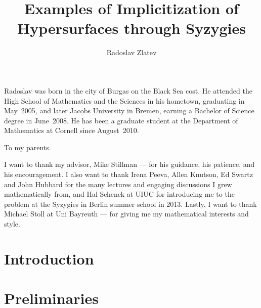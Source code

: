 \documentclass[phd,tocprelim]{cornell}
\title {Examples of Implicitization of Hypersurfaces through Syzygies}
\author {Radoslav Zlatev}
\numberwithin{first}{chapter}
\begin{document}
\maketitle
\makecopyright

\begin{abstract}
\end{abstract}

\begin{biosketch}
Radoslav was born in the city of Burgas on the Black Sea cost.
He attended the High School of Mathematics and the Sciences in his hometown, graduating in May~2005,
and later Jacobs University in Bremen, earning a Bachelor of Science degree in June~2008.
He has been a graduate student at the Department of Mathematics at Cornell since August~2010.
\end{biosketch}

\begin{dedication}
To my parents.
\end{dedication}

\begin{acknowledgements}
I want to thank my advisor, Mike Stillman ---
for his guidance, his patience, and his encouragement.
I also want to thank Irena Peeva, Allen Knutson, Ed Swartz and John Hubbard
for the many lectures and engaging discussions I grew mathematically from,
and Hal Schenck at UIUC for introducing me to the problem
at the Syzygies in Berlin summer school in 2013.
Lastly, I want to thank Michael Stoll at Uni Bayreuth --- 
for giving me my mathematical interests and style.
\end{acknowledgements}

\contentspage
\tablelistpage
\figurelistpage

\normalspacing \setcounter{page}{1} 
\pagestyle{cornell} \addtolength{\parskip}{0.5\baselineskip}


\chapter{Introduction}
\label{ch:intro}


\chapter{Preliminaries}
\label{ch:preliminaries}


\end{document}
